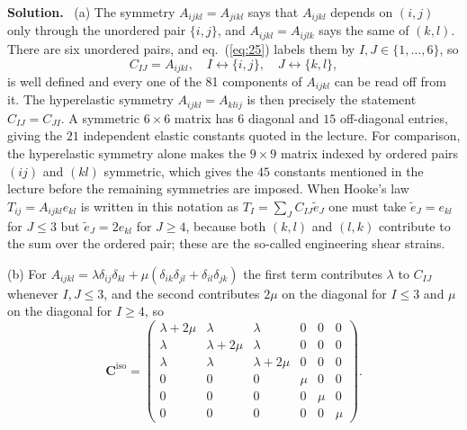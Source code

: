 \documentclass[a4paper,12pt]{paper}
\newenvironment{solution}{\par\noindent\textbf{Solution.}\ }{\par\medskip}
\begin{document}
\begin{solution}
(a) The symmetry $A_{ijkl}=A_{jikl}$ says that $A_{ijkl}$ depends on $(i,j)$ only through the
unordered pair $\{i,j\}$, and $A_{ijkl}=A_{ijlk}$ says the same of $(k,l)$. There are six unordered
pairs, and eq.~(\ref{eq:25}) labels them by $I,J\in\{1,\dots,6\}$, so
\begin{equation}
C_{IJ}=A_{ijkl},\quad I\leftrightarrow\{i,j\},\quad J\leftrightarrow\{k,l\},
\label{eq:26}
\end{equation}
is well defined and every one of the 81 components of $A_{ijkl}$ can be read off from it. The
hyperelastic symmetry $A_{ijkl}=A_{klij}$ is then precisely the statement $C_{IJ}=C_{JI}$. A
symmetric $6\times6$ matrix has $6$ diagonal and $15$ off-diagonal entries, giving the $21$
independent elastic constants quoted in the lecture. For comparison, the hyperelastic symmetry
alone makes the $9\times9$ matrix indexed by ordered pairs $(ij)$ and $(kl)$ symmetric, which gives
the $45$ constants mentioned in the lecture before the remaining symmetries are imposed. When
Hooke's law $T_{ij}=A_{ijkl}e_{kl}$ is written in this notation as $T_{I}=\sum_{J}C_{IJ}\tilde{e}_{J}$
one must take $\tilde{e}_{J}=e_{kl}$ for $J\le3$ but $\tilde{e}_{J}=2e_{kl}$ for $J\ge4$, because both
$(k,l)$ and $(l,k)$ contribute to the sum over the ordered pair; these are the so-called engineering
shear strains.

(b) For $A_{ijkl}=\lambda\delta_{ij}\delta_{kl}+\mu(\delta_{ik}\delta_{jl}+\delta_{il}\delta_{jk})$
the first term contributes $\lambda$ to $C_{IJ}$ whenever $I,J\le3$, and the second contributes
$2\mu$ on the diagonal for $I\le3$ and $\mu$ on the diagonal for $I\ge4$, so
\begin{equation}
\mathbf{C}^{\mathrm{iso}}=\begin{pmatrix}
\lambda+2\mu & \lambda & \lambda & 0 & 0 & 0\\
\lambda & \lambda+2\mu & \lambda & 0 & 0 & 0\\
\lambda & \lambda & \lambda+2\mu & 0 & 0 & 0\\
0 & 0 & 0 & \mu & 0 & 0\\
0 & 0 & 0 & 0 & \mu & 0\\
0 & 0 & 0 & 0 & 0 & \mu
\end{pmatrix}.
\label{eq:27}
\end{equation}


\end{solution}
\end{document}
